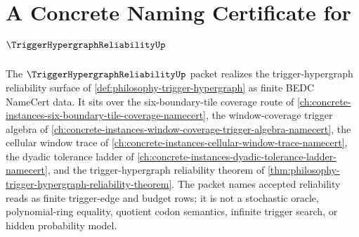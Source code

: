 \chapter{A Concrete Naming Certificate for $\TriggerHypergraphReliabilityUp$}
\label{ch:concrete-instances-trigger-hypergraph-reliability-namecert}

The $\TriggerHypergraphReliabilityUp$ packet realizes the trigger-hypergraph reliability surface of \autoref{def:philosophy-trigger-hypergraph} as finite BEDC NameCert data. It sits over the six-boundary-tile coverage route of \autoref{ch:concrete-instances-six-boundary-tile-coverage-namecert}, the window-coverage trigger algebra of \autoref{ch:concrete-instances-window-coverage-trigger-algebra-namecert}, the cellular window trace of \autoref{ch:concrete-instances-cellular-window-trace-namecert}, the dyadic tolerance ladder of \autoref{ch:concrete-instances-dyadic-tolerance-ladder-namecert}, and the trigger-hypergraph reliability theorem of \autoref{thm:philosophy-trigger-hypergraph-reliability-theorem}. The packet names accepted reliability reads as finite trigger-edge and budget rows; it is not a stochastic oracle, polynomial-ring equality, quotient codon semantics, infinite trigger search, or hidden probability model.

